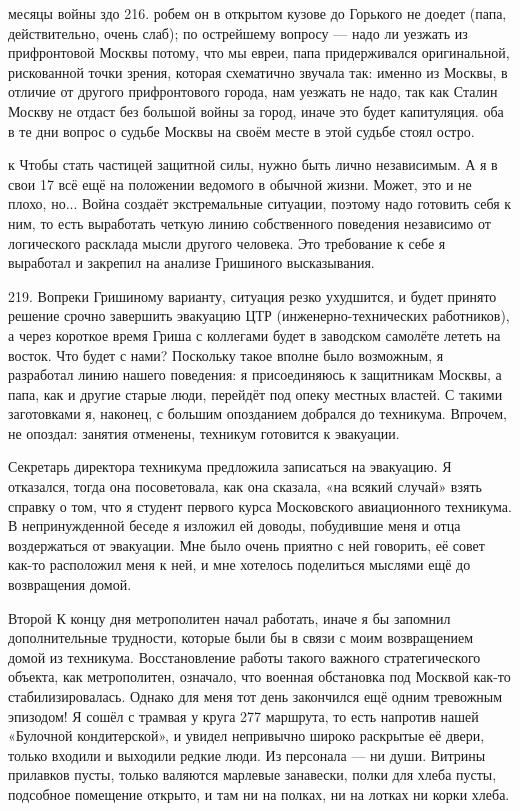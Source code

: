 \label{216-1}
месяцы войны здо 216. робем он в открытом кузове до Горького не доедет (папа, действительно, очень слаб); по острейшему вопросу — надо ли уезжать из прифронтовой Москвы потому, что мы евреи, папа придерживался оригинальной, рискованной точки зрения, которая схематично звучала так: именно из Москвы, в отличие от другого прифронтового города, нам уезжать не надо, так как Сталин Москву не отдаст без большой войны за город, иначе это будет капитуляция. оба в те дни вопрос о судьбе Москвы на своём месте в этой судьбе стоял остро.

\label{217-1}
к Чтобы стать частицей защитной силы, нужно быть лично независимым. А я в свои 17 всё ещё на положении ведомого в обычной жизни. Может, это и не плохо, но... Война создаёт экстремальные ситуации, поэтому надо готовить себя к ним, то есть выработать четкую линию собственного поведения независимо от логического расклада мысли другого человека. Это требование к себе я выработал и закрепил на анализе Гришиного высказывания.

\label{218-1}
219. Вопреки Гришиному варианту, ситуация резко ухудшится, и будет принято решение срочно завершить эвакуацию ЦТР (инженерно-технических работников), а через короткое время Гриша с коллегами будет в заводском самолёте лететь на восток. Что будет с нами? Поскольку такое вполне было возможным, я разработал линию нашего поведения: я присоединяюсь к защитникам Москвы, а папа, как и другие старые люди, перейдёт под опеку местных властей. С такими заготовками я, наконец, с большим опозданием добрался до техникума. Впрочем, не опоздал: занятия отменены, техникум готовится к эвакуации.

\label{219-1}
Секретарь директора техникума предложила записаться на эвакуацию. Я отказался, тогда она посоветовала, как она сказала, «на всякий случай» взять справку о том, что я студент первого курса Московского авиационного техникума. В непринужденной беседе я изложил ей доводы, побудившие меня и отца воздержаться от эвакуации. Мне было очень приятно с ней говорить, её совет как-то расположил меня к ней, и мне хотелось поделиться мыслями ещё до возвращения домой.

\label{221-1}
Второй
К концу дня метрополитен начал работать, иначе я бы запомнил дополнительные трудности, которые были бы в связи с моим возвращением домой из техникума. Восстановление работы такого важного стратегического объекта, как метрополитен, означало, что военная обстановка под Москвой как-то стабилизировалась. Однако для меня тот день закончился ещё одним тревожным эпизодом! Я сошёл с трамвая у круга 277 маршрута, то есть напротив нашей «Булочной кондитерской», и увидел непривычно широко раскрытые её двери, только входили и выходили редкие люди. Из персонала — ни души. Витрины прилавков пусты, только валяются марлевые занавески, полки для хлеба пусты, подсобное помещение открыто, и там ни на полках, ни на лотках ни корки хлеба.

